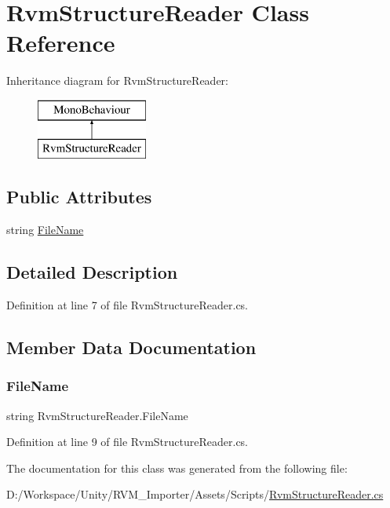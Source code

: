 \hypertarget{class_rvm_structure_reader}{}\section{Rvm\+Structure\+Reader Class Reference}
\label{class_rvm_structure_reader}
Inheritance diagram for Rvm\+Structure\+Reader\+:\begin{figure}[H]
\begin{center}
\leavevmode
\includegraphics[height=2.000000cm]{class_rvm_structure_reader}
\end{center}
\end{figure}
\subsection*{Public Attributes}
\begin{DoxyCompactItemize}
\item 
string \mbox{\hyperlink{class_rvm_structure_reader_ac3f5dbc43783e51008a044925f28f85a}{File\+Name}}
\end{DoxyCompactItemize}


\subsection{Detailed Description}


Definition at line 7 of file Rvm\+Structure\+Reader.\+cs.



\subsection{Member Data Documentation}
\mbox{\label{class_rvm_structure_reader_ac3f5dbc43783e51008a044925f28f85a}} 
\subsubsection{\texorpdfstring{FileName}{FileName}}
{\footnotesize\ttfamily string Rvm\+Structure\+Reader.\+File\+Name}



Definition at line 9 of file Rvm\+Structure\+Reader.\+cs.



The documentation for this class was generated from the following file\+:\begin{DoxyCompactItemize}
\item 
D\+:/\+Workspace/\+Unity/\+R\+V\+M\+\_\+\+Importer/\+Assets/\+Scripts/\mbox{\hyperlink{_rvm_structure_reader_8cs}{Rvm\+Structure\+Reader.\+cs}}\end{DoxyCompactItemize}
